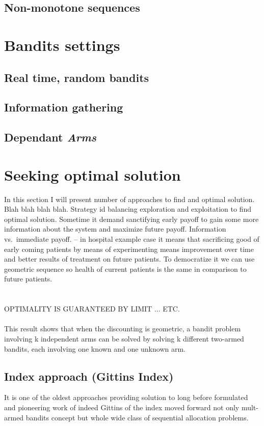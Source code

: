 \documentclass[12pt, a4paper, pdflatex]{report}
\begin{document}
\subsection{Non-monotone sequences}



\section{Bandits settings}
\subsection{Real time, random bandits}
\subsection{Information gathering}
\subsection{Dependant \emph{Arms}}



\section{Seeking optimal solution}
In this section I will present number of approaches to find and optimal solution.\\
Blah blah blah blah.
Strategy id balancing exploration and exploitation to find optimal solution. Sometime it demand sanctifying early payoff to gain some more information about the system and maximize future payoff.
Information vs.\ immediate payoff. -- in hospital example case it means that sacrificing good of early coming patients by means of experimenting means improvement over time and better results of treatment on future patients.
To democratize it we can use geometric sequence so health of current patients is the same in comparison to future patients.\\
\\
\\
OPTIMALITY IS GUARANTEED BY LIMIT ... ETC.
\\
\\
This result shows that when the discounting is geometric, a bandit problem involving k independent arms can be solved by solving k different two-armed bandits, each involving one known and one unknown arm.\\

\subsection{Index approach (Gittins Index)\label{sec:gitind}}
It is one of the oldest approaches providing solution to long before formulated and pioneering work of indeed Gittins of the index moved forward not only mult-armed bandits concept but whole wide class of sequential allocation problems.\\
\end{document}
